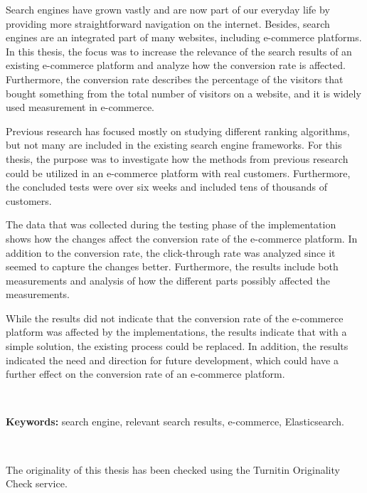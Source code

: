 

\noindent 
Search engines have grown vastly and are now part of our everyday life 
by providing more straightforward navigation on the internet.
Besides, search engines are an integrated part of many websites, including e-commerce 
platforms.
In this thesis, the focus was to increase the relevance of the search results
of an existing e-commerce platform and analyze how the conversion rate is affected.
Furthermore, the conversion rate describes the percentage of the visitors that 
bought something from the total number of visitors on a website, and it is widely
used measurement in e-commerce.


Previous research has focused mostly on studying different ranking algorithms, but not
many are included in the existing search engine frameworks.
For this thesis, the purpose was to investigate how the methods from previous 
research could be utilized in an e-commerce platform with real customers.
Furthermore, the concluded tests were over six weeks and included tens of thousands
of customers.

The data that was collected during the testing phase of the implementation
shows how the changes affect the conversion rate of the e-commerce platform.
In addition to the conversion rate, the click-through rate was analyzed since 
it seemed to capture the changes better.
Furthermore, the results include both measurements and analysis of how the different
parts possibly affected the measurements.

While the results did not indicate that the conversion rate of the e-commerce platform
was affected by the implementations, the results indicate that with a simple 
solution, the existing process could be replaced.
In addition, the results indicated the need and direction for future development, which could
have a further effect on the conversion rate of an e-commerce platform.


~

\noindent\textbf{Keywords:} search engine, relevant search results, e-commerce, Elasticsearch.

~

\noindent The originality of this thesis has been checked using the Turnitin Originality Check service.

\clearpage
